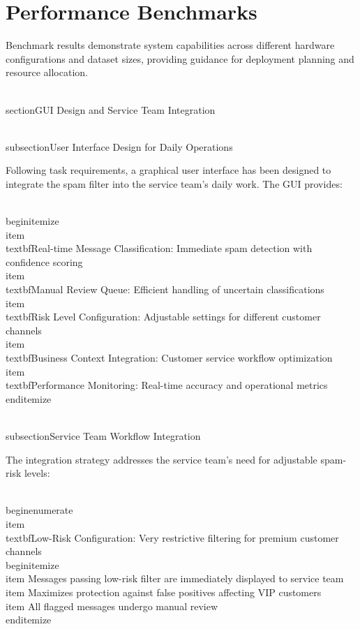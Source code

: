 \documentclass[12pt,a4paper]{article}
\begin{document}
\section{Performance Benchmarks}

Benchmark results demonstrate system capabilities across different hardware configurations and dataset sizes, providing guidance for deployment planning and resource allocation.

\\section{GUI Design and Service Team Integration}

\\subsection{User Interface Design for Daily Operations}

Following task requirements, a graphical user interface has been designed to integrate the spam filter into the service team's daily work. The GUI provides:

\\begin{itemize}
    \\item \\textbf{Real-time Message Classification}: Immediate spam detection with confidence scoring
    \\item \\textbf{Manual Review Queue}: Efficient handling of uncertain classifications
    \\item \\textbf{Risk Level Configuration}: Adjustable settings for different customer channels
    \\item \\textbf{Business Context Integration}: Customer service workflow optimization
    \\item \\textbf{Performance Monitoring}: Real-time accuracy and operational metrics
\\end{itemize}

\\subsection{Service Team Workflow Integration}

The integration strategy addresses the service team's need for adjustable spam-risk levels:

\\begin{enumerate}
    \\item \\textbf{Low-Risk Configuration}: Very restrictive filtering for premium customer channels
    \\begin{itemize}
        \\item Messages passing low-risk filter are immediately displayed to service team
        \\item Maximizes protection against false positives affecting VIP customers
        \\item All flagged messages undergo manual review
    \\end{itemize}
    
\end{document}
